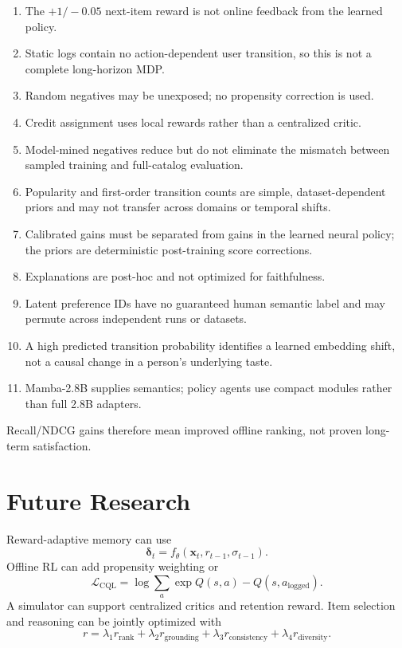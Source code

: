 \documentclass[11pt,a4paper]{article}
\begin{document}
\begin{enumerate}
  \item The $+1/-0.05$ next-item reward is not online feedback from the learned policy.
  \item Static logs contain no action-dependent user transition, so this is not a complete long-horizon MDP.
  \item Random negatives may be unexposed; no propensity correction is used.
  \item Credit assignment uses local rewards rather than a centralized critic.
  \item Model-mined negatives reduce but do not eliminate the mismatch between
  sampled training and full-catalog evaluation.
  \item Popularity and first-order transition counts are simple, dataset-dependent priors and may not transfer across domains or temporal shifts.
  \item Calibrated gains must be separated from gains in the learned neural policy; the priors are deterministic post-training score corrections.
  \item Explanations are post-hoc and not optimized for faithfulness.
  \item Latent preference IDs have no guaranteed human semantic label and may
  permute across independent runs or datasets.
  \item A high predicted transition probability identifies a learned embedding
  shift, not a causal change in a person's underlying taste.
  \item Mamba-2.8B supplies semantics; policy agents use compact modules rather
  than full 2.8B adapters.
\end{enumerate}

Recall/NDCG gains therefore mean improved offline ranking, not proven long-term satisfaction.

\section{Future Research}

Reward-adaptive memory can use
\begin{equation}
  \bm\delta_t=f_\theta(\bm x_t,r_{t-1},\sigma_{t-1}).
\end{equation}
Offline RL can add propensity weighting or
\begin{equation}
  \mathcal L_{\mathrm{CQL}}
  =
  \log\sum_a\exp Q(s,a)-Q(s,a_{\mathrm{logged}}).
\end{equation}
A simulator can support centralized critics and retention reward. Item selection and reasoning can be jointly optimized with
\begin{equation}
  r=
  \lambda_1r_{\mathrm{rank}}
  +\lambda_2r_{\mathrm{grounding}}
  +\lambda_3r_{\mathrm{consistency}}
  +\lambda_4r_{\mathrm{diversity}}.
\end{equation}
\end{document}

